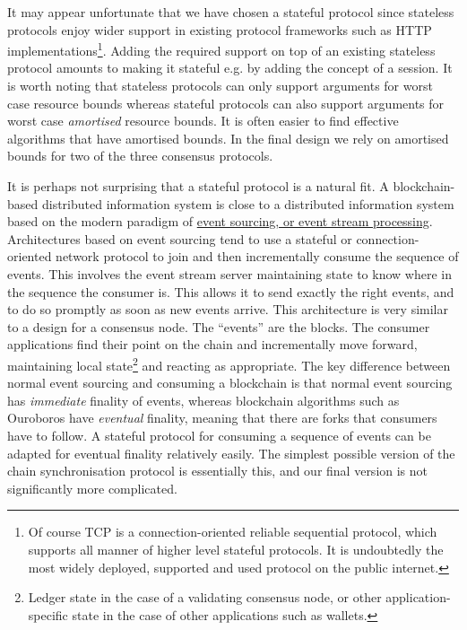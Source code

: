 \documentclass[11pt,a4paper]{article}
\begin{document}
It may appear unfortunate that we have chosen a stateful protocol since
stateless protocols enjoy wider support in existing protocol frameworks
such as HTTP implementations\footnote{Of course TCP is a
  connection-oriented reliable sequential protocol, which supports all
  manner of higher level stateful protocols. It is undoubtedly the most
  widely deployed, supported and used protocol on the public internet.}.
Adding the required support on top of an existing stateless protocol
amounts to making it stateful e.g. by adding the concept of a session.
It is worth noting that stateless protocols can only support arguments
for worst case resource bounds whereas stateful protocols can also
support arguments for worst case \emph{amortised} resource bounds. It is
often easier to find effective algorithms that have amortised bounds. In
the final design we rely on amortised bounds for two of the three
consensus protocols.

It is perhaps not surprising that a stateful protocol is a natural fit.
A blockchain-based distributed information system is close to a
distributed information system based on the modern paradigm of
\href{https://en.wikipedia.org/wiki/Event-driven_architecture}{{event
sourcing, or event stream processing}}. Architectures based on event
sourcing tend to use a stateful or connection-oriented network protocol
to join and then incrementally consume the sequence of events. This
involves the event stream server maintaining state to know where in the
sequence the consumer is. This allows it to send exactly the right
events, and to do so promptly as soon as new events arrive. This
architecture is very similar to a design for a consensus node. The
``events'' are the blocks. The consumer applications find their point on
the chain and incrementally move forward, maintaining local
state\footnote{Ledger state in the case of a validating consensus node,
  or other application-specific state in the case of other applications
  such as wallets.} and reacting as appropriate. The key difference
between normal event sourcing and consuming a blockchain is that normal
event sourcing has \emph{immediate} finality of events, whereas
blockchain algorithms such as Ouroboros have \emph{eventual} finality,
meaning that there are forks that consumers have to follow. A stateful
protocol for consuming a sequence of events can be adapted for eventual
finality relatively easily. The simplest possible version of the chain
synchronisation protocol is essentially this, and our final version is
not significantly more complicated.
\end{document}
